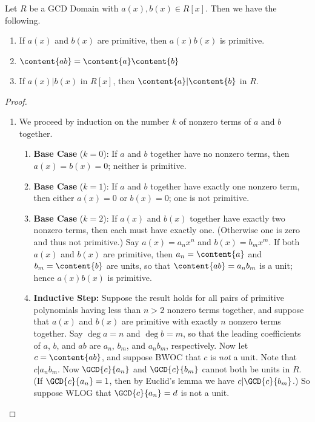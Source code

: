 \documentclass{article}
\begin{document}
\begin{prop}
Let $R$ be a GCD Domain with $a(x), b(x) \in R[x]$. Then we have the following.
\begin{enumerate}
\item If $a(x)$ and $b(x)$ are primitive, then $a(x)b(x)$ is primitive.
\item $\content{ab} = \content{a}\content{b}$
\item If $a(x)|b(x)$ in $R[x]$, then $\content{a}|\content{b}$ in $R$.
\end{enumerate}
\end{prop}

\begin{proof} \mbox{}
\begin{enumerate}
\item We proceed by induction on the number $k$ of nonzero terms of $a$ and $b$ together.
\begin{enumerate}
\item \textbf{Base Case} ($k = 0$): If $a$ and $b$ together have no nonzero terms, then $a(x) = b(x) = 0$; neither is primitive.
\item \textbf{Base Case} ($k = 1$): If $a$ and $b$ together have exactly one nonzero term, then either $a(x) = 0$ or $b(x) = 0$; one is not primitive.
\item \textbf{Base Case} ($k = 2$): If $a(x)$ and $b(x)$ together have exactly two nonzero terms, then each must have exactly one. (Otherwise one is zero and thus not primitive.) Say $a(x) = a_n x^n$ and $b(x) = b_m x^m$. If both $a(x)$ and $b(x)$ are primitive, then $a_n = \content{a}$ and $b_m = \content{b}$ are units, so that $\content{ab} = a_nb_m$ is a unit; hence $a(x)b(x)$ is primitive.
\item \textbf{Inductive Step:} Suppose the result holds for all pairs of primitive polynomials having less than $n > 2$ nonzero terms together, and suppose that $a(x)$ and $b(x)$ are primitive with exactly $n$ nonzero terms together. Say $\deg{a} = n$ and $\deg{b} = m$, so that the leading coefficients of $a$, $b$, and $ab$ are $a_n$, $b_m$, and $a_nb_m$, respectively. Now let $c = \content{ab}$, and suppose BWOC that $c$ is \emph{not} a unit. Note that $c|a_nb_m$. Now $\GCD{c}{a_n}$ and $\GCD{c}{b_m}$ cannot both be units in $R$. (If $\GCD{c}{a_n} = 1$, then by Euclid's lemma we have $c | \GCD{c}{b_m}$.) So suppose WLOG that $\GCD{c}{a_n} = d$ is not a unit.


\end{enumerate}
\end{enumerate}
\end{proof}
\end{document}
